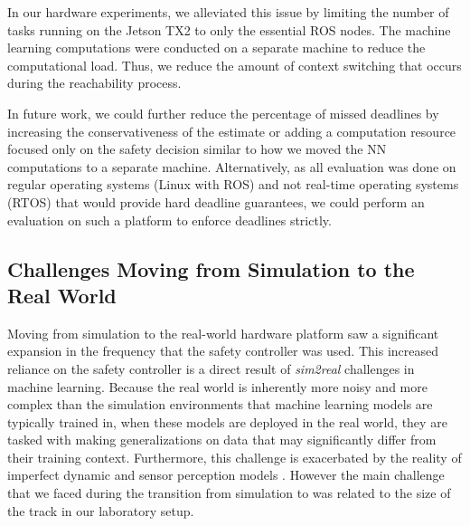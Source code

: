 \documentclass[manuscript,screen,review]{acmart}
\begin{document}
In our hardware experiments, we alleviated this issue by limiting the number of tasks running on the Jetson TX2 to only the essential ROS nodes. The machine learning computations were conducted on a separate machine to reduce the computational load. Thus, we reduce the amount of context switching that occurs during the reachability process. %

In future work, we could further reduce the percentage of missed deadlines by increasing the conservativeness of the estimate or adding a computation resource focused only on the safety decision similar to how we moved the NN computations to a separate machine. Alternatively, as all evaluation was done on regular operating systems (Linux with ROS) and not real-time operating systems (RTOS) that would provide hard deadline guarantees, we could perform an evaluation on such a platform to enforce deadlines strictly.


\subsection{Challenges Moving from Simulation to the Real World}

Moving from simulation to the real-world hardware platform saw a significant expansion in the frequency that the safety controller was used. This increased reliance on the safety controller is a direct result of \emph{sim2real} challenges in machine learning. Because the real world is inherently more noisy and more complex than the simulation environments that machine learning models are typically trained in, when these models are deployed in the real world, they are tasked with making generalizations on data that may significantly differ from their training context. Furthermore, this challenge is exacerbated by the reality of imperfect dynamic and sensor perception models \cite{ivanov2020case}. However the main challenge that we faced during the transition from simulation to was related to the size of the track in our laboratory setup.
\end{document}
